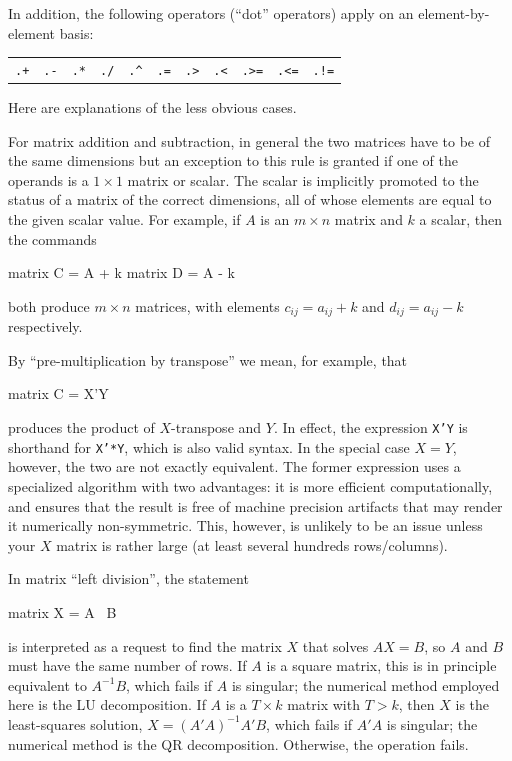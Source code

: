 In addition, the following operators (``dot'' operators) apply on an
element-by-element basis:

\begin{center}
\begin{tabular}{ccccccccccc}
\texttt{.+}  &  \texttt{.-}  &
\texttt{.*}  &  \texttt{./}  &  \verb+.^+  &
\texttt{.=}  &  \texttt{.>}  &  \texttt{.<} &
\texttt{.>=}  &  \texttt{.<=} & \texttt{.!=}
\end{tabular}
\end{center}

Here are explanations of the less obvious cases. 

For matrix addition and subtraction, in general the two matrices have
to be of the same dimensions but an exception to this rule is granted
if one of the operands is a $1\times 1$ matrix or scalar.  The scalar
is implicitly promoted to the status of a matrix of the correct
dimensions, all of whose elements are equal to the given scalar value.
For example, if $A$ is an $m \times n$ matrix and $k$ a scalar, then
the commands
%
\begin{code}
matrix C = A + k
matrix D = A - k
\end{code}
%
both produce $m \times n$ matrices, with elements $c_{ij} = 
a_{ij} + k$ and $d_{ij} = a_{ij} - k$ respectively.

By ``pre-multiplication by transpose'' we mean, for example, that 
%
\begin{code}
matrix C = X'Y
\end{code}
%
produces the product of $X$-transpose and $Y$.  In effect, the
expression \texttt{X'Y} is shorthand for \texttt{X'*Y}, which is also
valid syntax. In the special case $X = Y$, however, the two are not
exactly equivalent. The former expression uses a specialized algorithm
with two advantages: it is more efficient computationally, and ensures
that the result is free of machine precision artifacts that may render
it numerically non-symmetric. This, however, is unlikely to be an
issue unless your $X$ matrix is rather large (at least several
hundreds rows/columns).

In matrix ``left division'', the statement 
%
\begin{code}
matrix X = A \ B
\end{code}
%
is interpreted as a request to find the matrix $X$ that solves $AX=B$,
so $A$ and $B$ must have the same number of rows. If $A$ is a square
matrix, this is in principle equivalent to $A^{-1}B$, which fails if
$A$ is singular; the numerical method employed here is the LU
decomposition.  If $A$ is a $T \times k$ matrix with $T > k$, then $X$
is the least-squares solution, $X = (A'A)^{-1}A'B$, which fails if
$A'A$ is singular; the numerical method is the QR decomposition.
Otherwise, the operation fails.

